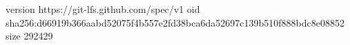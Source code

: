 version https://git-lfs.github.com/spec/v1
oid sha256:d66919b366aabd52075f4b557e2fd38bca6da52697c139b510f888bdc8e08852
size 292429
